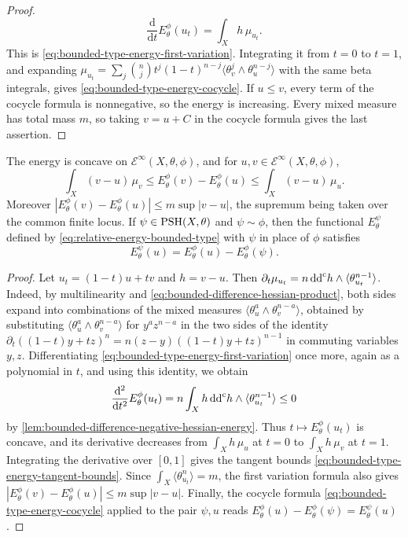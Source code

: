 \begin{proof}
\[
 \frac{\mathrm d}{\mathrm dt}E_\theta^\phi(u_t)=\int_Xh\,\mu_{u_t}.
\]
This is \eqref{eq:bounded-type-energy-first-variation}. Integrating it from $t=0$ to $t=1$, and expanding $\mu_{u_t}=\sum_j\binom nj t^j(1-t)^{n-j}\langle\theta_v^j\wedge\theta_u^{n-j}\rangle$ with the same beta integrals, gives \eqref{eq:bounded-type-energy-cocycle}. If $u\leq v$, every term of the cocycle formula is nonnegative, so the energy is increasing. Every mixed measure has total mass $m$, so taking $v=u+C$ in the cocycle formula gives the last assertion.
\end{proof}

\begin{proposition}\label{prop:bounded-type-energy-concavity}
The energy is concave on $\mathcal E^\infty(X,\theta,\phi)$, and for $u,v\in\mathcal E^\infty(X,\theta,\phi)$,
\begin{equation}\label{eq:bounded-type-energy-tangent-bounds}
 \int_X(v-u)\,\mu_v
       \leq E_\theta^\phi(v)-E_\theta^\phi(u)
       \leq\int_X(v-u)\,\mu_u.
\end{equation}
Moreover $|E_\theta^\phi(v)-E_\theta^\phi(u)|\leq m\sup|v-u|$, the supremum being taken over the common finite locus. If $\psi\in\mathrm{PSH}(X,\theta)$ and $\psi\sim\phi$, then the functional $E_\theta^\psi$ defined by \eqref{eq:relative-energy-bounded-type} with $\psi$ in place of $\phi$ satisfies
\[
 E_\theta^\psi(u)=E_\theta^\phi(u)-E_\theta^\phi(\psi).
\]
\end{proposition}
\begin{proof}
Let $u_t=(1-t)u+tv$ and $h=v-u$. Then $\partial_t\mu_{u_t}=n\,\mathrm{dd}^{\mathrm{c}} h\wedge\langle\theta_{u_t}^{n-1}\rangle$. Indeed, by multilinearity and \eqref{eq:bounded-difference-hessian-product}, both sides expand into combinations of the mixed measures $\langle\theta_u^a\wedge\theta_v^{n-a}\rangle$, obtained by substituting $\langle\theta_u^a\wedge\theta_v^{n-a}\rangle$ for $y^az^{n-a}$ in the two sides of the identity $\partial_t((1-t)y+tz)^n=n(z-y)((1-t)y+tz)^{n-1}$ in commuting variables $y,z$. Differentiating \eqref{eq:bounded-type-energy-first-variation} once more, again as a polynomial in $t$, and using this identity, we obtain
\[
 \frac{\mathrm d^2}{\mathrm dt^2}E_\theta^\phi(u_t)
         =n\int_Xh\,\mathrm{dd}^{\mathrm{c}} h\wedge
                               \langle\theta_{u_t}^{n-1}\rangle\leq0
\]
by \cref{lem:bounded-difference-negative-hessian-energy}. Thus $t\mapsto E_\theta^\phi(u_t)$ is concave, and its derivative decreases from $\int_Xh\,\mu_u$ at $t=0$ to $\int_Xh\,\mu_v$ at $t=1$. Integrating the derivative over $[0,1]$ gives the tangent bounds \eqref{eq:bounded-type-energy-tangent-bounds}. Since $\int_X\langle\theta_{u_t}^n\rangle=m$, the first variation formula also gives $|E_\theta^\phi(v)-E_\theta^\phi(u)|\leq m\sup|v-u|$. Finally, the cocycle formula \eqref{eq:bounded-type-energy-cocycle} applied to the pair $\psi,u$ reads $E_\theta^\phi(u)-E_\theta^\phi(\psi)=E_\theta^\psi(u)$.
\end{proof}


